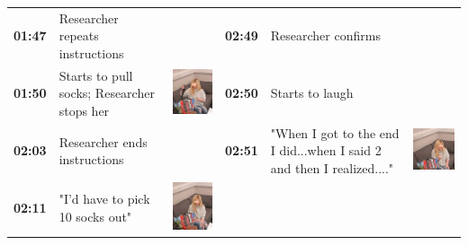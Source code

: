 \documentclass[twocolumn, issue, empirical, authordate,drafn]{jote-new-article}
\begin{document}
\begin{table}[ht!]
\begin{fullwidth}
\begin{tabularx}{\linewidth}{@{} m{.05\linewidth} m{.28\linewidth} >{\raggedleft\arraybackslash}m{.1\linewidth}  m{.05\linewidth} m{.28\linewidth} >{\raggedleft\arraybackslash}m{.1\linewidth} @{}}
\textbf{01:47} & Researcher repeats instructions &  &
 \textbf{02:49} & Researcher confirms & \\
 
\textbf{01:50} & Starts to pull socks; Researcher stops her & \includegraphics[height=.09\textheight, valign=t]{media/image20.png} &
 \textbf{02:50} & Starts to laugh & \\ 
 
 \textbf{02:03} & Researcher ends instructions & &
 \textbf{02:51} & "When I got to the end I did...when I said 2 and then I realized...." & \includegraphics[height=.09\textheight, valign=t]{media/image28.png} \\ 
 
 \textbf{02:11} & "I'd have to pick 10 socks out" & \includegraphics[height=.09\textheight, valign=t]{media/image21.png} & & &\\
\end{tabularx}
\end{fullwidth}
\baselineskip
\end{table}
\end{document}
